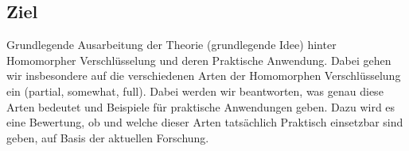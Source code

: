 \subsection{Ziel}
    Grundlegende Ausarbeitung der Theorie (grundlegende Idee) hinter Homomorpher Verschlüsselung und deren Praktische Anwendung. Dabei gehen wir insbesondere auf die verschiedenen Arten der Homomorphen Verschlüsselung ein (partial, somewhat, full). Dabei werden wir beantworten, was genau diese Arten bedeutet und Beispiele für praktische Anwendungen geben. Dazu wird es eine Bewertung, ob und welche dieser Arten tatsächlich Praktisch einsetzbar sind geben, auf Basis der aktuellen Forschung.
